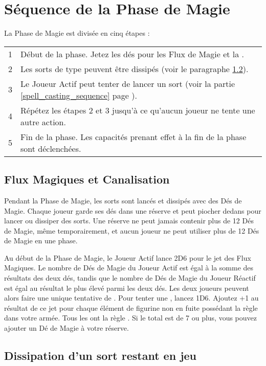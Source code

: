 \newpage
\section{Séquence de la Phase de Magie}
\label{magic_phase_sequence}

La Phase de Magie est divisée en cinq étapes :

\hspace*{0.3cm}
\begin{tabular}{c|m{14cm}}
1 & Début de la phase. Jetez les dés pour les Flux de Magie et la \channel{}. \tabularnewline
2 & Les sorts de type \remainsinplay{} peuvent être dissipés (voir le paragraphe \ref{dispel_remains_in_play_spells}). \tabularnewline
3 & Le Joueur Actif peut tenter de lancer un sort (voir la partie \ref{spell_casting_sequence} page \pageref{spell_casting_sequence}). \tabularnewline
4 & Répétez les étapes 2 et 3 jusqu'à ce qu'aucun joueur ne tente une autre action. \tabularnewline
5 & Fin de la phase. Les capacités prenant effet à la fin de la phase sont déclenchées. \tabularnewline
\end{tabular}

\hypertarget{magicflux}{\subsection{Flux Magiques et Canalisation}}

Pendant la Phase de Magie, les sorts sont lancés et dissipés avec des Dés de Magie. Chaque joueur garde ses dés dans une réserve et peut piocher dedans pour lancer ou dissiper des sorts. Une réserve ne peut jamais contenir plus de 12 Dés de Magie, même temporairement, et aucun joueur ne peut utiliser plus de 12 Dés de Magie en une phase.

Au début de la Phase de Magie, le Joueur Actif lance 2D6 pour le jet des Flux Magiques. Le nombre de Dés de Magie du Joueur Actif est égal à la somme des résultats des deux dés, tandis que le nombre de Dés de Magie du Joueur Réactif est égal au résultat le plus élevé parmi les deux dés. Les deux joueurs peuvent alors faire une unique tentative de \channel{}. Pour tenter une \channel{}, lancez 1D6. Ajoutez +1 au résultat de ce jet pour chaque élément de figurine non en fuite possédant la règle \channel{} dans votre armée. Tous les \wizards{} ont la règle \channel{}. Si le total est de 7 ou plus, vous pouvez ajouter un Dé de Magie à votre réserve.

\subsection{Dissipation d'un sort restant en jeu}
\label{dispel_remains_in_play_spells}

